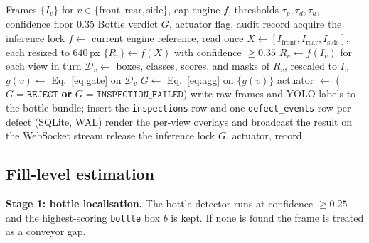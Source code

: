 \begin{algorithm}[htbp]
\caption{Station 1 cap inspection cycle}
\label{alg:capcycle}
\begin{algorithmic}[1]
\Require Frames $\{I_v\}$ for $v\in\{\text{front},\text{rear},\text{side}\}$, cap engine $f$, thresholds $\tau_p,\tau_d,\tau_u$, confidence floor $0.35$
\Ensure Bottle verdict $G$, actuator flag, audit record
\State acquire the inference lock 
\State $f \gets$ current engine reference, read once 
\State $X \gets [I_{\text{front}}, I_{\text{rear}}, I_{\text{side}}]$, each resized to $640$\,px
\State $\{R_v\} \gets f(X)$ with confidence $\geq0.35$ 
    \State $R_v \gets f(I_v)$ for each view in turn 
\EndIf
{}
    \State $\mathcal{D}_v \gets$ boxes, classes, scores, and masks of $R_v$, rescaled to $I_v$ 
    \State $g(v) \gets$ Eq.~\eqref{eq:gate} on $\mathcal{D}_v$
\EndFor
\State $G \gets$ Eq.~\eqref{eq:agg} on $\{g(v)\}$
\State actuator $\gets$ ($G=\texttt{REJECT}$ \textbf{or} $G=\texttt{INSPECTION\_FAILED}$)
\State write raw frames and YOLO labels to the bottle bundle; insert the \texttt{inspections} row and one \texttt{defect\_events} row per defect (SQLite, WAL)
\State render the per-view overlays and broadcast the result on the WebSocket stream
\State release the inference lock
\State \Return $G$, actuator, record
\end{algorithmic}
\end{algorithm}

\subsection{Fill-level estimation}
\label{sec:fill-impl}

\noindent\textbf{Stage 1: bottle localisation.} The bottle detector runs at confidence $\geq0.25$ and the highest-scoring \texttt{bottle} box $b$ is kept. If none is found the frame is treated as a conveyor gap.

